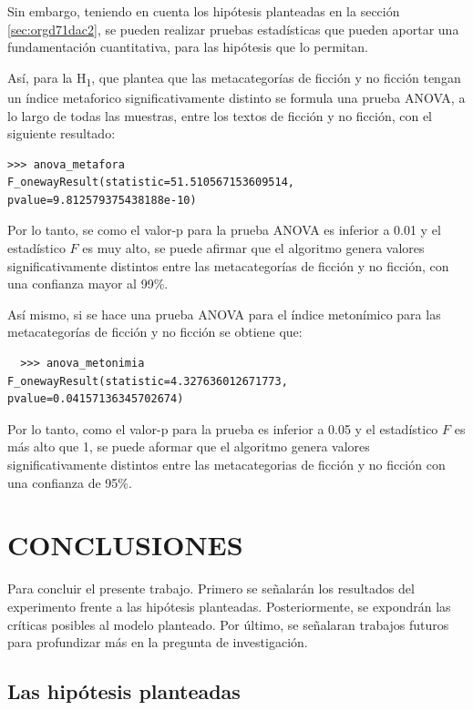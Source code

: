 \documentclass[12pt,letterpaper,twoside]{article}
\begin{document}
Sin embargo, teniendo en cuenta los hipótesis planteadas en la sección \ref{sec:orgd71dac2},
se pueden realizar pruebas estadísticas que pueden aportar una fundamentación cuantitativa,
para las hipótesis que lo permitan.

Así, para la H\textsubscript{1}, que plantea que las metacategorías de ficción y no ficción tengan un
índice metaforico significativamente distinto se formula una prueba ANOVA, a lo largo de
todas las muestras, entre los textos de ficción y no ficción, con el siguiente resultado:

\begin{verbatim}
>>> anova_metafora
F_onewayResult(statistic=51.510567153609514, pvalue=9.812579375438188e-10)

\end{verbatim}

Por lo tanto, se como el valor-p para la prueba ANOVA es inferior a 0.01 y
el estadístico \(F\) es muy alto, se puede afirmar que el algoritmo genera valores
significativamente distintos entre las metacategorías de ficción y no ficción,
con una confianza mayor al 99\%.

Así mismo, si se hace una prueba ANOVA para el índice metonímico para las
metacategorías de ficción y no ficción se obtiene que:


\begin{verbatim}
  >>> anova_metonimia
F_onewayResult(statistic=4.327636012671773, pvalue=0.04157136345702674)

\end{verbatim}

Por lo tanto, como el valor-p para la prueba es inferior a 0.05 y el estadístico
\(F\) es más alto que 1, se puede aformar que el algoritmo genera valores
significativamente distintos entre las metacategorias de ficción y no ficción
con una confianza de 95\%.



\section{CONCLUSIONES}
\label{sec:orgb82e547}

Para concluir el presente trabajo. Primero se señalarán los
resultados del experimento frente a las hipótesis planteadas.
Posteriormente, se expondrán las críticas posibles al modelo
planteado. Por último, se señalaran trabajos futuros para profundizar
más en la pregunta de investigación.

\subsection{Las hipótesis planteadas}
\label{sec:orgf8f949c}
\end{document}
